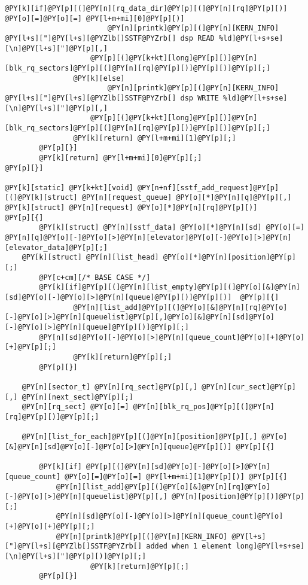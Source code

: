 \begin{Verbatim}[commandchars=@\[\]]
                @PY[k][if]@PY[p][(]@PY[n][rq_data_dir]@PY[p][(]@PY[n][rq]@PY[p][)] @PY[o][=]@PY[o][=] @PY[l+m+mi][0]@PY[p][)]
                        @PY[n][printk]@PY[p][(]@PY[n][KERN_INFO] @PY[l+s]["]@PY[l+s][@PYZlb[]SSTF@PYZrb[] dsp READ %ld]@PY[l+s+se][\n]@PY[l+s]["]@PY[p][,]
					@PY[p][(]@PY[k+kt][long]@PY[p][)]@PY[n][blk_rq_sectors]@PY[p][(]@PY[n][rq]@PY[p][)]@PY[p][)]@PY[p][;]
                @PY[k][else]
                        @PY[n][printk]@PY[p][(]@PY[n][KERN_INFO] @PY[l+s]["]@PY[l+s][@PYZlb[]SSTF@PYZrb[] dsp WRITE %ld]@PY[l+s+se][\n]@PY[l+s]["]@PY[p][,]
					@PY[p][(]@PY[k+kt][long]@PY[p][)]@PY[n][blk_rq_sectors]@PY[p][(]@PY[n][rq]@PY[p][)]@PY[p][)]@PY[p][;]
                @PY[k][return] @PY[l+m+mi][1]@PY[p][;]
        @PY[p][}]
        @PY[k][return] @PY[l+m+mi][0]@PY[p][;]
@PY[p][}]

@PY[k][static] @PY[k+kt][void] @PY[n+nf][sstf_add_request]@PY[p][(]@PY[k][struct] @PY[n][request_queue] @PY[o][*]@PY[n][q]@PY[p][,] @PY[k][struct] @PY[n][request] @PY[o][*]@PY[n][rq]@PY[p][)]
@PY[p][{]
        @PY[k][struct] @PY[n][sstf_data] @PY[o][*]@PY[n][sd] @PY[o][=] @PY[n][q]@PY[o][-]@PY[o][>]@PY[n][elevator]@PY[o][-]@PY[o][>]@PY[n][elevator_data]@PY[p][;]
	@PY[k][struct] @PY[n][list_head] @PY[o][*]@PY[n][position]@PY[p][;]
        @PY[c+cm][/* BASE CASE */]
        @PY[k][if]@PY[p][(]@PY[n][list_empty]@PY[p][(]@PY[o][&]@PY[n][sd]@PY[o][-]@PY[o][>]@PY[n][queue]@PY[p][)]@PY[p][)]  @PY[p][{]
                @PY[n][list_add]@PY[p][(]@PY[o][&]@PY[n][rq]@PY[o][-]@PY[o][>]@PY[n][queuelist]@PY[p][,]@PY[o][&]@PY[n][sd]@PY[o][-]@PY[o][>]@PY[n][queue]@PY[p][)]@PY[p][;]
		@PY[n][sd]@PY[o][-]@PY[o][>]@PY[n][queue_count]@PY[o][+]@PY[o][+]@PY[p][;]
                @PY[k][return]@PY[p][;]
        @PY[p][}]

	@PY[n][sector_t] @PY[n][rq_sect]@PY[p][,] @PY[n][cur_sect]@PY[p][,] @PY[n][next_sect]@PY[p][;]
	@PY[n][rq_sect] @PY[o][=] @PY[n][blk_rq_pos]@PY[p][(]@PY[n][rq]@PY[p][)]@PY[p][;]

	@PY[n][list_for_each]@PY[p][(]@PY[n][position]@PY[p][,] @PY[o][&]@PY[n][sd]@PY[o][-]@PY[o][>]@PY[n][queue]@PY[p][)] @PY[p][{]
		
		@PY[k][if] @PY[p][(]@PY[n][sd]@PY[o][-]@PY[o][>]@PY[n][queue_count] @PY[o][=]@PY[o][=] @PY[l+m+mi][1]@PY[p][)] @PY[p][{]
			@PY[n][list_add]@PY[p][(]@PY[o][&]@PY[n][rq]@PY[o][-]@PY[o][>]@PY[n][queuelist]@PY[p][,] @PY[n][position]@PY[p][)]@PY[p][;]
			@PY[n][sd]@PY[o][-]@PY[o][>]@PY[n][queue_count]@PY[o][+]@PY[o][+]@PY[p][;]
			@PY[n][printk]@PY[p][(]@PY[n][KERN_INFO] @PY[l+s]["]@PY[l+s][@PYZlb[]SSTF@PYZrb[] added when 1 element long]@PY[l+s+se][\n]@PY[l+s]["]@PY[p][)]@PY[p][;]
	                @PY[k][return]@PY[p][;]
		@PY[p][}]
		

\end{Verbatim}

